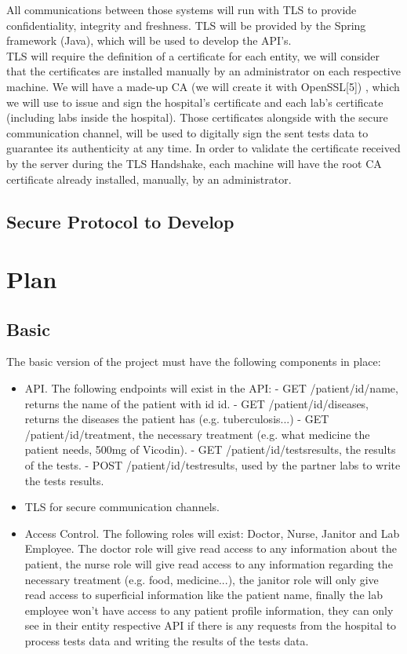 All communications between those systems will run with TLS to provide confidentiality, integrity and freshness. TLS will be provided by the Spring framework (Java), which will be used to develop the API's. \\
	
TLS will require the definition of a certificate for each entity, we will consider that the certificates are installed manually by an administrator on each respective machine.
We will have a made-up CA (we will create it with OpenSSL[5]) , which we will use to issue and sign the hospital's certificate and each lab's certificate (including labs inside the hospital). Those certificates alongside with the secure communication channel, will be used to digitally sign the sent tests data to guarantee its authenticity at any time.
In order to validate the certificate received by the server during the TLS Handshake, each machine will have the root CA certificate already installed, manually, by an administrator.\\ 

\subsection{Secure Protocol to Develop}
	

\section{Plan}

\subsection{Basic}
The basic version of the project must have the following components in place:
\begin{itemize}
	\item API.
		\subitem The following endpoints will exist in the API:
		\subitem - GET /patient/{id}/name, returns the name of the patient with id {id}.
		\subitem - GET /patient/{id}/diseases, returns the diseases the patient has (e.g. tuberculosis...)
		\subitem - GET /patient/{id}/treatment, the necessary treatment (e.g. what medicine the patient needs, 500mg of Vicodin).
		\subitem - GET /patient/{id}/testsresults, the results of the tests.
		\subitem - POST /patient/{id}/testresults, used by the partner labs to write the tests results.
	\item TLS for secure communication channels.
	\item Access Control.
		\subitem The following roles will exist: Doctor, Nurse, Janitor and Lab Employee. The doctor role will give read access to any information about the patient, the nurse role will give read access to any information regarding the necessary treatment (e.g. food, medicine...), the janitor role will only give  read access to superficial information like the patient name, finally the lab employee won't have access to any patient profile information, they can only see in their entity respective API if there is any requests from the hospital to process tests data and writing the results of the tests data.
\end{itemize}

